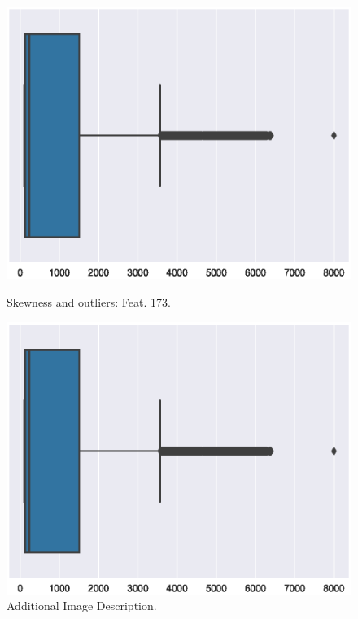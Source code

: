 \begin{figure}[!ht]
	\centering
	\begin{minipage}{0.49\textwidth}
		\centering
		\includegraphics[scale=0.3]{fig/boxplot_skew}
		\caption{Skewness and outliers: Feat. 173.}
		\label{fig:Skewness}
	\end{minipage}\hfill
	\begin{minipage}{0.49\textwidth}
		\centering
		\includegraphics[scale=0.3]{fig/boxplot_skew}
		\caption{Additional Image Description.}
		\label{fig:additionalImage}
	\end{minipage}
\end{figure}


